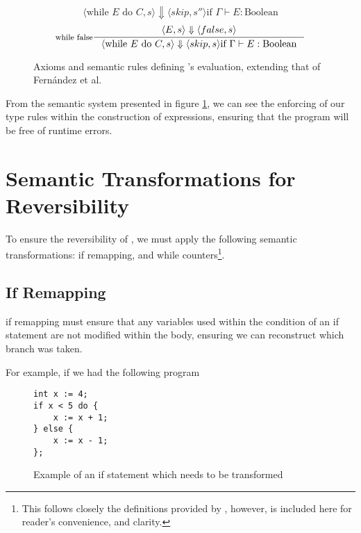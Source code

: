 \begin{figure}[hbt!]
\[{        }{
        \langle \text{while } E \text{ do } C, s \rangle \Downarrow \langle skip, s'' \rangle \text{if } \Gamma \vdash E : \text{Boolean}
        }
    \]
    \vspace{0.2cm}
    \[
        \inference[while false]{
        \langle E, s \rangle \Downarrow \langle false, s \rangle
        }{
        \langle \text{while } E \text{ do } C, s \rangle \Downarrow \langle skip, s \rangle \text{if } \Gamma \vdash E : \text{Boolean}
        }
    \]
    \caption{Axioms and semantic rules defining \rimp's evaluation, extending that of Fern{\'a}ndez et al.\cite{Rimp}}
    \label{fig:semantic-system}
\end{figure}

From the semantic system presented in figure \ref{fig:semantic-system}, we can see the enforcing of our type rules within the construction of expressions, ensuring that the program will be free of runtime errors.


\section{Semantic Transformations for Reversibility}\label{sec:SemanticTransformations}

To ensure the reversibility of \rimplang, we must apply the following semantic transformations: if remapping, and while counters\footnote{This follows closely the definitions provided by \rimplang, however, is included here for reader's convenience, and clarity.}.

\subsection{If Remapping}

if remapping must ensure that any variables used within the condition of an if statement are not modified within the body, ensuring we can reconstruct which branch was taken.

For example, if we had the following program

\begin{figure}[ht]
    \centering
    \begin{lstlisting}[label={lst:ifexample}, basicstyle=\small]
int x := 4;
if x < 5 do {
    x := x + 1;
} else {
    x := x - 1;
};
    \end{lstlisting}
    \caption{Example of an if statement which needs to be transformed}
    \label{fig:ifexample}
\end{figure}

